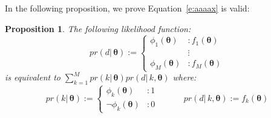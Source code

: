 \documentclass[letterpaper]{article}
\newtheorem{proposition}{Proposition}
\begin{document}
In the following proposition, we prove Equation~\ref{e:aaaax} is valid:
%
\begin{proposition}
\label{pro:discrete}
The following likelihood function:
{\footnotesize
\begin{equation}
pr(d | \, \boldsymbol\theta) := 
\begin{cases}
\phi_1(\boldsymbol\theta)  &\!\!\!\!: f_1(\boldsymbol\theta)\\
									  &\!\!\!\!\vdots\\
\phi_M(\boldsymbol\theta)  &\!\!\!\!: f_M(\boldsymbol\theta)
\end{cases}
\label{e:piecewise.likelihood22}
\end{equation}
}
is equivalent to 
$\sum_{k = 1}^M pr(k | \, \boldsymbol\theta) pr(d | \, k, \boldsymbol\theta)$
where:
{\footnotesize
\begin{equation}
\label{e:2rel2299}
pr(k |\, \boldsymbol\theta) := 
\begin{cases}
\phi_k(\boldsymbol\theta)  &\!\!\!\!: 1\\
\neg \phi_k(\boldsymbol\theta) &\!\!\!\!: 0
\end{cases}
\qquad \quad
pr(d | \, k, \boldsymbol\theta) := f_k(\boldsymbol\theta)
\end{equation}
}
\end{proposition}
\end{document}
